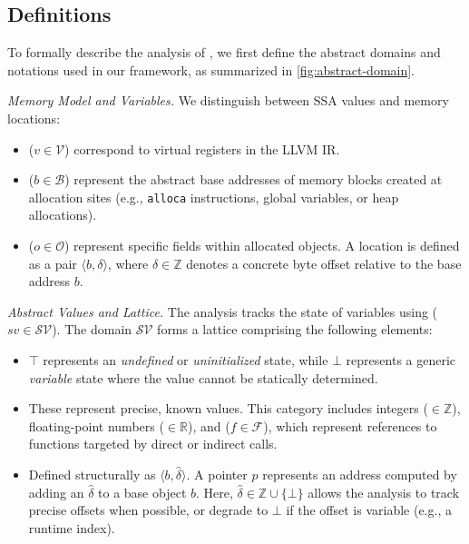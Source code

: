 \subsection{Definitions}\label{sec:design:definitions}

To formally describe the analysis of \mysys, we first define the abstract domains and notations used in our framework, as summarized in \autoref{fig:abstract-domain}.

\textit{Memory Model and Variables.}
We distinguish between SSA values and memory locations:
\begin{itemize}
    \item {} ($v \in \mathcal{V}$) correspond to virtual registers in the LLVM IR.
    \item {} ($b \in \mathcal{B}$) represent the abstract base addresses of memory blocks created at allocation sites (e.g., \texttt{alloca} instructions, global variables, or heap allocations).
    \item {} ($o \in \mathcal{O}$) represent specific fields within allocated objects. A location is defined as a pair $\langle b, \delta \rangle$, where $\delta \in \mathbb{Z}$ denotes a concrete byte offset relative to the base address $b$.
\end{itemize}

\textit{Abstract Values and Lattice.}
The analysis tracks the state of variables using  ($sv \in \mathcal{SV}$). The domain $\mathcal{SV}$ forms a lattice comprising the following elements:
\begin{itemize}
    \item {} $\top$ represents an \textit{undefined} or \textit{uninitialized} state, while $\bot$ represents a generic \textit{variable} state where the value cannot be statically determined.
    \item {} These represent precise, known values. This category includes integers ($\in \mathbb{Z}$), floating-point numbers ($\in \mathbb{R}$), and  ($f \in \mathcal{F}$), which represent references to functions targeted by direct or indirect calls.
    \item {} Defined structurally as $\langle b, \hat{\delta} \rangle$. A pointer $p$ represents an address computed by adding an  $\hat{\delta}$ to a base object $b$. Here, $\hat{\delta} \in \mathbb{Z} \cup \{\bot\}$ allows the analysis to track precise offsets when possible, or degrade to $\bot$ if the offset is variable (e.g., a runtime index).
\end{itemize}

